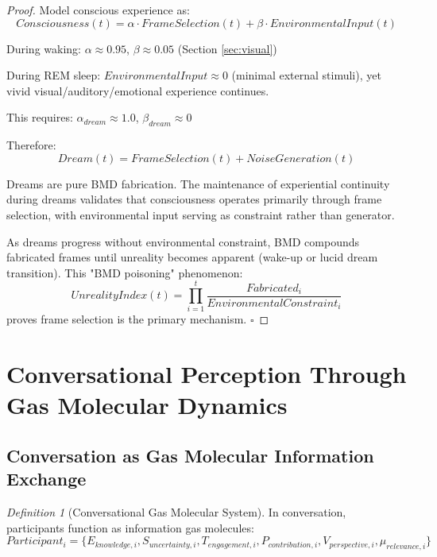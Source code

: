 \documentclass[12pt]{article}
\theoremstyle{definition}
\newtheorem{definition}[theorem]{Definition}
\theoremstyle{remark}
\newtheorem{definition}[theorem]{Definition}
\begin{document}
\begin{proof}
Model conscious experience as:
\begin{equation}
Consciousness(t) = \alpha \cdot FrameSelection(t) + \beta \cdot EnvironmentalInput(t)
\end{equation}

During waking: $\alpha \approx 0.95$, $\beta \approx 0.05$ (Section \ref{sec:visual})

During REM sleep: $EnvironmentalInput \approx 0$ (minimal external stimuli), yet vivid visual/auditory/emotional experience continues.

This requires: $\alpha_{dream} \approx 1.0$, $\beta_{dream} \approx 0$

Therefore:
\begin{equation}
Dream(t) = FrameSelection(t) + NoiseGeneration(t)
\end{equation}

Dreams are pure BMD fabrication. The maintenance of experiential continuity during dreams validates that consciousness operates primarily through frame selection, with environmental input serving as constraint rather than generator.

As dreams progress without environmental constraint, BMD compounds fabricated frames until unreality becomes apparent (wake-up or lucid dream transition). This "BMD poisoning" phenomenon:
\begin{equation}
UnrealityIndex(t) = \prod_{i=1}^{t} \frac{Fabricated_i}{EnvironmentalConstraint_i}
\end{equation}
proves frame selection is the primary mechanism. $\square$
\end{proof}

\section{Conversational Perception Through Gas Molecular Dynamics}
\label{sec:conversation}

\subsection{Conversation as Gas Molecular Information Exchange}

\begin{definition}[Conversational Gas Molecular System]
In conversation, participants function as information gas molecules:
\begin{equation}
Participant_i = \{E_{knowledge,i}, S_{uncertainty,i}, T_{engagement,i}, P_{contribution,i}, V_{perspective,i}, \mu_{relevance,i}\}
\end{equation}
\end{definition}
\end{document}
